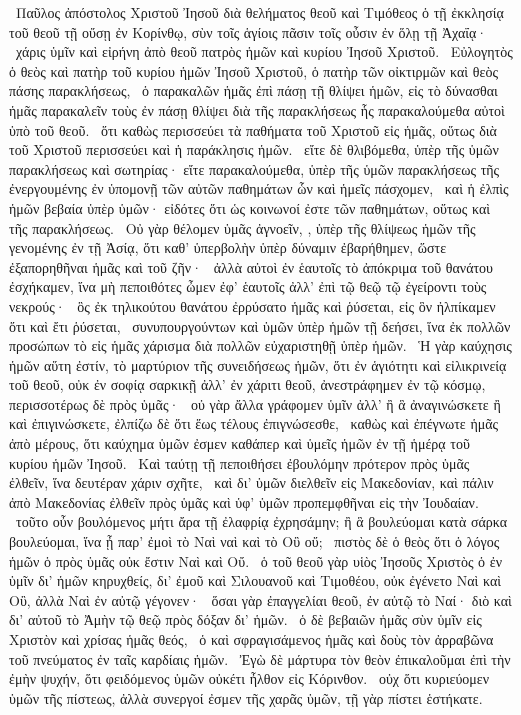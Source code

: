 ~Παῦλος ἀπόστολος Χριστοῦ Ἰησοῦ διὰ θελήματος θεοῦ καὶ Τιμόθεος ὁ  τῇ ἐκκλησίᾳ τοῦ θεοῦ τῇ οὔσῃ ἐν Κορίνθῳ, σὺν τοῖς ἁγίοις πᾶσιν τοῖς οὖσιν ἐν ὅλῃ τῇ Ἀχαΐᾳ·
~χάρις ὑμῖν καὶ εἰρήνη ἀπὸ θεοῦ πατρὸς ἡμῶν καὶ κυρίου Ἰησοῦ Χριστοῦ.
~Εὐλογητὸς ὁ θεὸς καὶ πατὴρ τοῦ κυρίου ἡμῶν Ἰησοῦ Χριστοῦ, ὁ πατὴρ τῶν οἰκτιρμῶν καὶ θεὸς πάσης παρακλήσεως,
~ὁ παρακαλῶν ἡμᾶς ἐπὶ πάσῃ τῇ θλίψει ἡμῶν, εἰς τὸ δύνασθαι ἡμᾶς παρακαλεῖν τοὺς ἐν πάσῃ θλίψει διὰ τῆς παρακλήσεως ἧς παρακαλούμεθα αὐτοὶ ὑπὸ τοῦ θεοῦ.
~ὅτι καθὼς περισσεύει τὰ παθήματα τοῦ Χριστοῦ εἰς ἡμᾶς, οὕτως διὰ τοῦ Χριστοῦ περισσεύει καὶ ἡ παράκλησις ἡμῶν.
~εἴτε δὲ θλιβόμεθα, ὑπὲρ τῆς ὑμῶν παρακλήσεως καὶ σωτηρίας· εἴτε παρακαλούμεθα, ὑπὲρ τῆς ὑμῶν παρακλήσεως τῆς ἐνεργουμένης ἐν ὑπομονῇ τῶν αὐτῶν παθημάτων ὧν καὶ ἡμεῖς πάσχομεν,
~καὶ ἡ ἐλπὶς ἡμῶν βεβαία ὑπὲρ ὑμῶν· εἰδότες ὅτι ὡς κοινωνοί ἐστε τῶν παθημάτων, οὕτως καὶ τῆς παρακλήσεως.
~Οὐ γὰρ θέλομεν ὑμᾶς ἀγνοεῖν, , ὑπὲρ τῆς θλίψεως ἡμῶν τῆς γενομένης ἐν τῇ Ἀσίᾳ, ὅτι καθ’ ὑπερβολὴν ὑπὲρ δύναμιν ἐβαρήθημεν, ὥστε ἐξαπορηθῆναι ἡμᾶς καὶ τοῦ ζῆν·
~ἀλλὰ αὐτοὶ ἐν ἑαυτοῖς τὸ ἀπόκριμα τοῦ θανάτου ἐσχήκαμεν, ἵνα μὴ πεποιθότες ὦμεν ἐφ’ ἑαυτοῖς ἀλλ’ ἐπὶ τῷ θεῷ τῷ ἐγείροντι τοὺς νεκρούς·
~ὃς ἐκ τηλικούτου θανάτου ἐρρύσατο ἡμᾶς καὶ ῥύσεται, εἰς ὃν ἠλπίκαμεν ὅτι καὶ ἔτι ῥύσεται,
~συνυπουργούντων καὶ ὑμῶν ὑπὲρ ἡμῶν τῇ δεήσει, ἵνα ἐκ πολλῶν προσώπων τὸ εἰς ἡμᾶς χάρισμα διὰ πολλῶν εὐχαριστηθῇ ὑπὲρ ἡμῶν.
~Ἡ γὰρ καύχησις ἡμῶν αὕτη ἐστίν, τὸ μαρτύριον τῆς συνειδήσεως ἡμῶν, ὅτι ἐν ἁγιότητι καὶ εἰλικρινείᾳ τοῦ θεοῦ, οὐκ ἐν σοφίᾳ σαρκικῇ ἀλλ’ ἐν χάριτι θεοῦ, ἀνεστράφημεν ἐν τῷ κόσμῳ, περισσοτέρως δὲ πρὸς ὑμᾶς·
~οὐ γὰρ ἄλλα γράφομεν ὑμῖν ἀλλ’ ἢ ἃ ἀναγινώσκετε ἢ καὶ ἐπιγινώσκετε, ἐλπίζω δὲ ὅτι ἕως τέλους ἐπιγνώσεσθε,
~καθὼς καὶ ἐπέγνωτε ἡμᾶς ἀπὸ μέρους, ὅτι καύχημα ὑμῶν ἐσμεν καθάπερ καὶ ὑμεῖς ἡμῶν ἐν τῇ ἡμέρᾳ τοῦ κυρίου ἡμῶν Ἰησοῦ.
~Καὶ ταύτῃ τῇ πεποιθήσει ἐβουλόμην πρότερον πρὸς ὑμᾶς ἐλθεῖν, ἵνα δευτέραν χάριν σχῆτε,
~καὶ δι’ ὑμῶν διελθεῖν εἰς Μακεδονίαν, καὶ πάλιν ἀπὸ Μακεδονίας ἐλθεῖν πρὸς ὑμᾶς καὶ ὑφ’ ὑμῶν προπεμφθῆναι εἰς τὴν Ἰουδαίαν.
~τοῦτο οὖν βουλόμενος μήτι ἄρα τῇ ἐλαφρίᾳ ἐχρησάμην; ἢ ἃ βουλεύομαι κατὰ σάρκα βουλεύομαι, ἵνα ᾖ παρ’ ἐμοὶ τὸ Ναὶ ναὶ καὶ τὸ Οὒ οὔ;
~πιστὸς δὲ ὁ θεὸς ὅτι ὁ λόγος ἡμῶν ὁ πρὸς ὑμᾶς οὐκ ἔστιν Ναὶ καὶ Οὔ.
~ὁ τοῦ θεοῦ γὰρ υἱὸς Ἰησοῦς Χριστὸς ὁ ἐν ὑμῖν δι’ ἡμῶν κηρυχθείς, δι’ ἐμοῦ καὶ Σιλουανοῦ καὶ Τιμοθέου, οὐκ ἐγένετο Ναὶ καὶ Οὒ, ἀλλὰ Ναὶ ἐν αὐτῷ γέγονεν·
~ὅσαι γὰρ ἐπαγγελίαι θεοῦ, ἐν αὐτῷ τὸ Ναί· διὸ καὶ δι’ αὐτοῦ τὸ Ἀμὴν τῷ θεῷ πρὸς δόξαν δι’ ἡμῶν.
~ὁ δὲ βεβαιῶν ἡμᾶς σὺν ὑμῖν εἰς Χριστὸν καὶ χρίσας ἡμᾶς θεός,
~ὁ καὶ σφραγισάμενος ἡμᾶς καὶ δοὺς τὸν ἀρραβῶνα τοῦ πνεύματος ἐν ταῖς καρδίαις ἡμῶν.
~Ἐγὼ δὲ μάρτυρα τὸν θεὸν ἐπικαλοῦμαι ἐπὶ τὴν ἐμὴν ψυχήν, ὅτι φειδόμενος ὑμῶν οὐκέτι ἦλθον εἰς Κόρινθον.
~οὐχ ὅτι κυριεύομεν ὑμῶν τῆς πίστεως, ἀλλὰ συνεργοί ἐσμεν τῆς χαρᾶς ὑμῶν, τῇ γὰρ πίστει ἑστήκατε.

